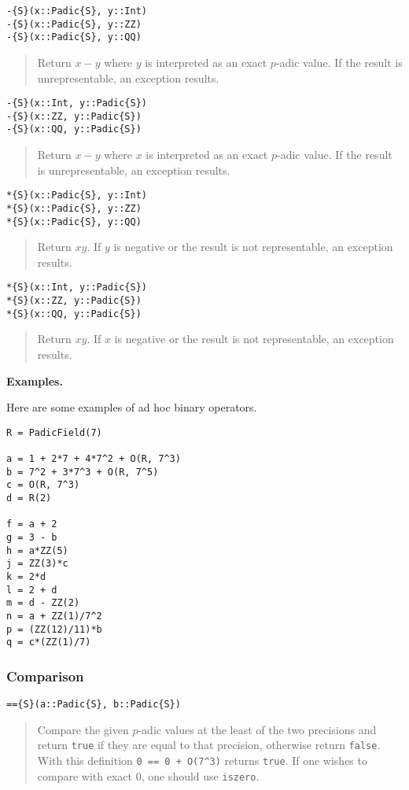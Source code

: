 \documentclass[a4paper,10pt]{article}
\newcommand{\code}{\lstinline}
\newcommand{\desc}[1]{\vspace{-3mm}\begin{quote}#1\end{quote}}
\begin{document}
{{\begin{lstlisting}
-{S}(x::Padic{S}, y::Int)
-{S}(x::Padic{S}, y::ZZ)
-{S}(x::Padic{S}, y::QQ)
\end{lstlisting}

\desc{Return $x - y$ where $y$ is interpreted as an exact $p$-adic value. If
the result is unrepresentable, an exception results.}

\begin{lstlisting}
-{S}(x::Int, y::Padic{S})
-{S}(x::ZZ, y::Padic{S})
-{S}(x::QQ, y::Padic{S})
\end{lstlisting}

\desc{Return $x - y$ where $x$ is interpreted as an exact $p$-adic value. If
the result is unrepresentable, an exception results.}

\begin{lstlisting}
*{S}(x::Padic{S}, y::Int)
*{S}(x::Padic{S}, y::ZZ)
*{S}(x::Padic{S}, y::QQ)
\end{lstlisting}

\desc{Return $xy$. If $y$ is negative or the result is not representable, an
exception results.}

\begin{lstlisting}
*{S}(x::Int, y::Padic{S})
*{S}(x::ZZ, y::Padic{S})
*{S}(x::QQ, y::Padic{S})
\end{lstlisting}

\desc{Return $xy$. If $x$ is negative or the result is not representable, an 
exception results.}

\textbf{Examples.}

Here are some examples of ad hoc binary operators.

\begin{lstlisting}
R = PadicField(7)

a = 1 + 2*7 + 4*7^2 + O(R, 7^3)
b = 7^2 + 3*7^3 + O(R, 7^5)
c = O(R, 7^3)
d = R(2)

f = a + 2
g = 3 - b
h = a*ZZ(5)
j = ZZ(3)*c
k = 2*d
l = 2 + d
m = d - ZZ(2)
n = a + ZZ(1)/7^2
p = (ZZ(12)/11)*b
q = c*(ZZ(1)/7)
\end{lstlisting}

\subsubsection{Comparison}

\begin{lstlisting}
=={S}(a::Padic{S}, b::Padic{S})
\end{lstlisting}

\desc{Compare the given $p$-adic values at the least of the two precisions and
return \code{true} if they are equal to that precision, otherwise return
\code{false}. With this definition \code{0 == 0 + O(7^3)} returns
\code{true}. If one wishes to compare with exact $0$, one should use
\code{iszero}.}

}}
\end{document}
